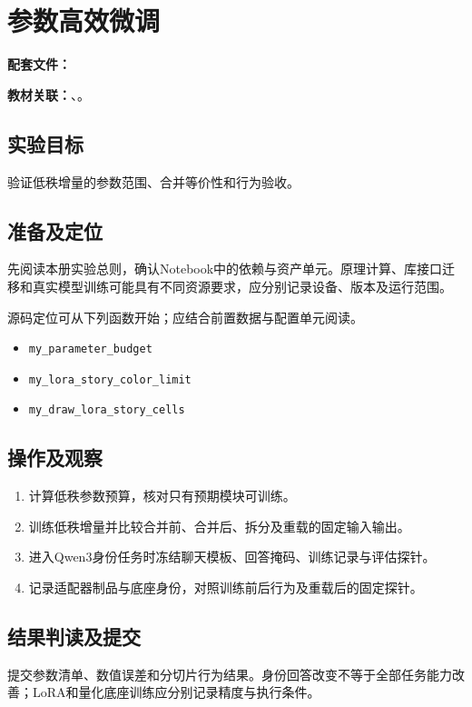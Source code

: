 \chapter{参数高效微调}
\label{lab:42_peft}

\noindent\textbf{配套文件：}\par
\noindent\textbf{教材关联：}、。

\section*{实验目标}
验证低秩增量的参数范围、合并等价性和行为验收。

\section*{准备及定位}
先阅读本册实验总则，确认Notebook中的依赖与资产单元。原理计算、库接口迁移和真实模型训练可能具有不同资源要求，应分别记录设备、版本及运行范围。

源码定位可从下列函数开始；应结合前置数据与配置单元阅读。
\begin{itemize}
\item \texttt{my\_parameter\_budget}
\item \texttt{my\_lora\_story\_color\_limit}
\item \texttt{my\_draw\_lora\_story\_cells}
\end{itemize}

\section*{操作及观察}
\begin{enumerate}
\item 计算低秩参数预算，核对只有预期模块可训练。
\item 训练低秩增量并比较合并前、合并后、拆分及重载的固定输入输出。
\item 进入Qwen3身份任务时冻结聊天模板、回答掩码、训练记录与评估探针。
\item 记录适配器制品与底座身份，对照训练前后行为及重载后的固定探针。
\end{enumerate}

\section*{结果判读及提交}
提交参数清单、数值误差和分切片行为结果。身份回答改变不等于全部任务能力改善；LoRA和量化底座训练应分别记录精度与执行条件。


